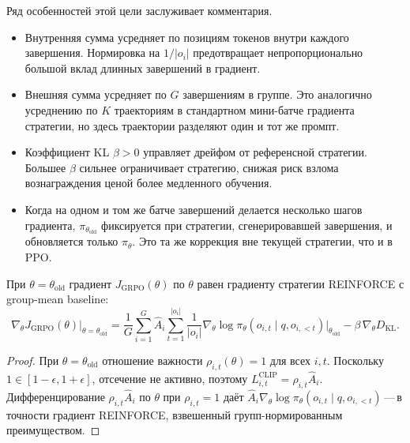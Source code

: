 Ряд особенностей этой цели заслуживает комментария.

\begin{itemize}[leftmargin=*]
\item Внутренняя сумма усредняет по позициям токенов внутри каждого завершения. Нормировка на $1/|o_i|$ предотвращает непропорционально большой вклад длинных завершений в градиент.
\item Внешняя сумма усредняет по $G$ завершениям в группе. Это аналогично усреднению по $K$ траекториям в стандартном мини-батче градиента стратегии, но здесь траектории разделяют один и тот же промпт.
\item Коэффициент KL $\beta > 0$ управляет дрейфом от референсной стратегии. Большее $\beta$ сильнее ограничивает стратегию, снижая риск взлома вознаграждения ценой более медленного обучения.
\item Когда на одном и том же батче завершений делается несколько шагов градиента, $\pi_{\theta_\mathrm{old}}$ фиксируется при стратегии, сгенерировавшей завершения, и обновляется только $\pi_\theta$. Это та же коррекция вне текущей стратегии, что и в PPO.
\end{itemize}

\begin{proposition}
\label{prop:grpo-local-gradient}
При $\theta = \theta_\mathrm{old}$ градиент $J_{\mathrm{GRPO}}(\theta)$ по $\theta$ равен градиенту стратегии REINFORCE с group-mean baseline:
\begin{equation}
\label{eq:grpo-local-grad}
\nabla_\theta J_{\mathrm{GRPO}}(\theta)\big|_{\theta = \theta_\mathrm{old}}
= \frac{1}{G}\sum_{i=1}^G \hat{A}_i \sum_{t=1}^{|o_i|} \frac{1}{|o_i|}\nabla_\theta \log \pi_\theta(o_{i,t} \mid q, o_{i,<t})\Big|_{\theta_\mathrm{old}}
- \beta\,\nabla_\theta D_{\mathrm{KL}}.
\end{equation}
\end{proposition}

\begin{proof}
При $\theta = \theta_\mathrm{old}$ отношение важности $\rho_{i,t}(\theta) = 1$ для всех $i, t$. Поскольку $1 \in [1-\epsilon, 1+\epsilon]$, отсечение не активно, поэтому $L_{i,t}^{\mathrm{CLIP}} = \rho_{i,t}\hat{A}_i$. Дифференцирование $\rho_{i,t}\hat{A}_i$ по $\theta$ при $\rho_{i,t} = 1$ даёт $\hat{A}_i \nabla_\theta \log \pi_\theta(o_{i,t} \mid q, o_{i,<t})$\,---\,в точности градиент REINFORCE, взвешенный групп-нормированным преимуществом.
\end{proof}

